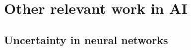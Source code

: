 
\section{Other relevant work in AI}
\red{[TODO]}

\subsection{Uncertainty in neural networks}
\red{[TODO]}